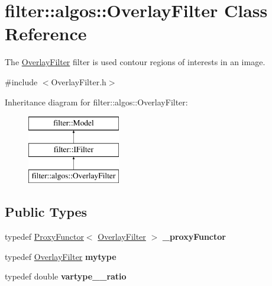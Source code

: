 \hypertarget{classfilter_1_1algos_1_1_overlay_filter}{}\section{filter\+:\+:algos\+:\+:Overlay\+Filter Class Reference}
\label{classfilter_1_1algos_1_1_overlay_filter}


The \hyperlink{classfilter_1_1algos_1_1_overlay_filter}{Overlay\+Filter} filter is used contour regions of interests in an image.  




{\ttfamily \#include $<$Overlay\+Filter.\+h$>$}

Inheritance diagram for filter\+:\+:algos\+:\+:Overlay\+Filter\+:\begin{figure}[H]
\begin{center}
\leavevmode
\includegraphics[height=3.000000cm]{dd/dfa/classfilter_1_1algos_1_1_overlay_filter}
\end{center}
\end{figure}
\subsection*{Public Types}
\begin{DoxyCompactItemize}
\item 
\mbox{\label{classfilter_1_1algos_1_1_overlay_filter_a04a628af3c9e93c669888d270994b7d7}} 
typedef \hyperlink{class_proxy_functor}{Proxy\+Functor}$<$ \hyperlink{classfilter_1_1algos_1_1_overlay_filter}{Overlay\+Filter} $>$ {\bfseries \+\_\+proxy\+Functor}
\item 
\mbox{\label{classfilter_1_1algos_1_1_overlay_filter_a63364128612c545361099f98680da919}} 
typedef \hyperlink{classfilter_1_1algos_1_1_overlay_filter}{Overlay\+Filter} {\bfseries mytype}
\item 
\mbox{\label{classfilter_1_1algos_1_1_overlay_filter_a78f5dc41d8682ab0b5237933aa1957ec}} 
typedef double {\bfseries vartype\+\_\+\+\_\+ratio}
\end{DoxyCompactItemize}
